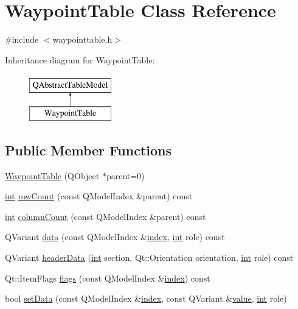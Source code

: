 \hypertarget{class_waypoint_table}{\section{Waypoint\-Table Class Reference}
\label{class_waypoint_table}
}


{\ttfamily \#include $<$waypointtable.\-h$>$}

Inheritance diagram for Waypoint\-Table\-:\begin{figure}[H]
\begin{center}
\leavevmode
\includegraphics[height=2.000000cm]{class_waypoint_table}
\end{center}
\end{figure}
\subsection*{Public Member Functions}
\begin{DoxyCompactItemize}
\item 
\hyperlink{group___waypoint_editor_gadget_plugin_ga62b0d5f07aaa7e091ea9b812437936a3}{Waypoint\-Table} (Q\-Object $\ast$parent=0)
\item 
\hyperlink{ioapi_8h_a787fa3cf048117ba7123753c1e74fcd6}{int} \hyperlink{group___waypoint_editor_gadget_plugin_ga0e60d1faba432ebe1d1e8de7c8cf02bf}{row\-Count} (const Q\-Model\-Index \&parent) const 
\item 
\hyperlink{ioapi_8h_a787fa3cf048117ba7123753c1e74fcd6}{int} \hyperlink{group___waypoint_editor_gadget_plugin_gac82408f059700c3a127f3d9a2f870d27}{column\-Count} (const Q\-Model\-Index \&parent) const 
\item 
Q\-Variant \hyperlink{group___waypoint_editor_gadget_plugin_ga983933a1c8fe4e9e8489d7b0f2b78461}{data} (const Q\-Model\-Index \&\hyperlink{glext_8h_ab47dd9958bcadea08866b42bf358e95e}{index}, \hyperlink{ioapi_8h_a787fa3cf048117ba7123753c1e74fcd6}{int} role) const 
\item 
Q\-Variant \hyperlink{group___waypoint_editor_gadget_plugin_ga73be101f51619703a8a69f23849f87b6}{header\-Data} (\hyperlink{ioapi_8h_a787fa3cf048117ba7123753c1e74fcd6}{int} section, Qt\-::\-Orientation orientation, \hyperlink{ioapi_8h_a787fa3cf048117ba7123753c1e74fcd6}{int} role) const 
\item 
Qt\-::\-Item\-Flags \hyperlink{group___waypoint_editor_gadget_plugin_ga268c5385ef4dc152ddcee5ff2fddbaba}{flags} (const Q\-Model\-Index \&\hyperlink{glext_8h_ab47dd9958bcadea08866b42bf358e95e}{index}) const 
\item 
bool \hyperlink{group___waypoint_editor_gadget_plugin_gae65ee6e837693667105fc594acc874eb}{set\-Data} (const Q\-Model\-Index \&\hyperlink{glext_8h_ab47dd9958bcadea08866b42bf358e95e}{index}, const Q\-Variant \&\hyperlink{glext_8h_aa0e2e9cea7f208d28acda0480144beb0}{value}, \hyperlink{ioapi_8h_a787fa3cf048117ba7123753c1e74fcd6}{int} role)
\end{DoxyCompactItemize}
